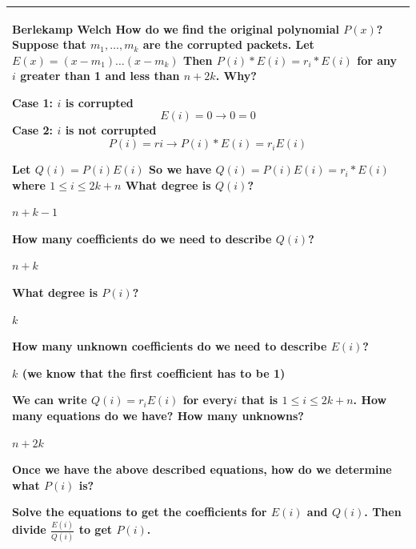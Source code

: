 \clearpage
{\tabulinesep=1mm
\begin{tabu}{|p{16cm} |}
\hline
\textbf{Berlekamp Welch} \newline
How do we find the original polynomial $P(x)$? \newline
Suppose that $m_1, \dotsc, m_k$ are the corrupted packets. Let $E(x) = (x - m_1) \dotsc (x - m_k)$
Then $P(i) * E(i) = r_i * E(i)$ for any $i$ greater than 1 and less than $n + 2k$. Why?
\begin{solution}[5 cm]
	Case 1: $i$ is corrupted
\[E(i) = 0 \rightarrow 0 = 0\]
			Case 2: $i$ is not corrupted
				\[P(i) = ri \rightarrow P(i) * E(i) = r_i E(i)\]
\end{solution}

Let $Q(i) = P(i) E(i)$
So we have $Q(i)= P(i) E(i) = r_i * E(i)$ where $1 \leq i \leq 2k + n$
What degree is $Q(i)$? 
\begin{solution}[1 cm]
$n + k - 1$
\end{solution}

How many coefficients do we need to describe $Q(i)$? 
\begin{solution}[1 cm]
$n + k$
\end{solution}

What degree is $P(i)$? 
\begin{solution}[1 cm]
$k$
\end{solution}

How many unknown coefficients do we need to describe $E(i)$? 
\begin{solution}[2 cm]
$k$ (we know that the first coefficient has to be 1)
\end{solution}

We can write $Q(i) = r_i E(i)$ for every$ i$ that is $1 \leq i \leq 2k + n$. \newline
How many equations do we have? How many unknowns? 
\begin{solution}[1 cm]
$n + 2k$
\end{solution}

Once we have the above described equations, how do we determine what 
$P(i)$ is?
\begin{solution}[3 cm]
Solve the equations to get the coefficients for $E(i)$ and $Q(i)$. 
Then divide $\frac{E(i)}{Q(i)}$ to get $P(i)$.
\end{solution}
\\
\hline
\end{tabu}
}